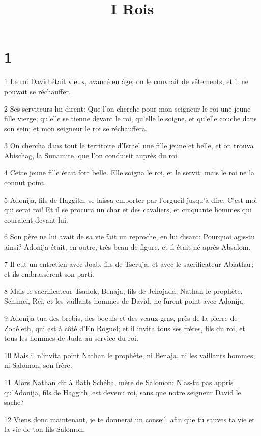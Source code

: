 

\title{I Rois}


\chapter{1}

\par 1 Le roi David était vieux, avancé en âge; on le couvrait de vêtements, et il ne pouvait se réchauffer.
\par 2 Ses serviteurs lui dirent: Que l'on cherche pour mon seigneur le roi une jeune fille vierge; qu'elle se tienne devant le roi, qu'elle le soigne, et qu'elle couche dans son sein; et mon seigneur le roi se réchauffera.
\par 3 On chercha dans tout le territoire d'Israël une fille jeune et belle, et on trouva Abischag, la Sunamite, que l'on conduisit auprès du roi.
\par 4 Cette jeune fille était fort belle. Elle soigna le roi, et le servit; mais le roi ne la connut point.
\par 5 Adonija, fils de Haggith, se laissa emporter par l'orgueil jusqu'à dire: C'est moi qui serai roi! Et il se procura un char et des cavaliers, et cinquante hommes qui couraient devant lui.
\par 6 Son père ne lui avait de sa vie fait un reproche, en lui disant: Pourquoi agis-tu ainsi? Adonija était, en outre, très beau de figure, et il était né après Absalom.
\par 7 Il eut un entretien avec Joab, fils de Tseruja, et avec le sacrificateur Abiathar; et ils embrassèrent son parti.
\par 8 Mais le sacrificateur Tsadok, Benaja, fils de Jehojada, Nathan le prophète, Schimeï, Réï, et les vaillants hommes de David, ne furent point avec Adonija.
\par 9 Adonija tua des brebis, des boeufs et des veaux gras, près de la pierre de Zohéleth, qui est à côté d'En Roguel; et il invita tous ses frères, fils du roi, et tous les hommes de Juda au service du roi.
\par 10 Mais il n'invita point Nathan le prophète, ni Benaja, ni les vaillants hommes, ni Salomon, son frère.
\par 11 Alors Nathan dit à Bath Schéba, mère de Salomon: N'as-tu pas appris qu'Adonija, fils de Haggith, est devenu roi, sans que notre seigneur David le sache?
\par 12 Viens donc maintenant, je te donnerai un conseil, afin que tu sauves ta vie et la vie de ton fils Salomon.
